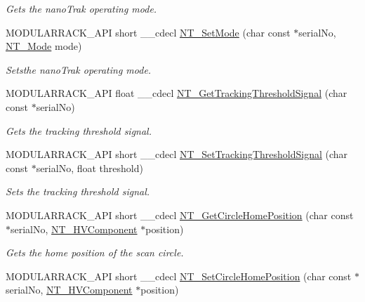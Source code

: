 \begin{DoxyCompactItemize}
\begin{DoxyCompactList}\small\item\em Gets the nano\+Trak operating mode. \end{DoxyCompactList}\item 
M\+O\+D\+U\+L\+A\+R\+R\+A\+C\+K\+\_\+\+A\+PI short \+\_\+\+\_\+cdecl \hyperlink{group___modular_nano_trak_gacd4e02b6f70af52a328723f21e3d4928}{N\+T\+\_\+\+Set\+Mode} (char const $\ast$serial\+No, \hyperlink{group___common_gab868c9a5ae40544a9debc2e28cdef1a8}{N\+T\+\_\+\+Mode} mode)
\begin{DoxyCompactList}\small\item\em Setsthe nano\+Trak operating mode. \end{DoxyCompactList}\item 
M\+O\+D\+U\+L\+A\+R\+R\+A\+C\+K\+\_\+\+A\+PI float \+\_\+\+\_\+cdecl \hyperlink{group___modular_nano_trak_gaf141efe5bca31c33a51767c7dc962811}{N\+T\+\_\+\+Get\+Tracking\+Threshold\+Signal} (char const $\ast$serial\+No)
\begin{DoxyCompactList}\small\item\em Gets the tracking threshold signal. \end{DoxyCompactList}\item 
M\+O\+D\+U\+L\+A\+R\+R\+A\+C\+K\+\_\+\+A\+PI short \+\_\+\+\_\+cdecl \hyperlink{group___modular_nano_trak_ga3d5c305c0e4adfc84d594152b8591684}{N\+T\+\_\+\+Set\+Tracking\+Threshold\+Signal} (char const $\ast$serial\+No, float threshold)
\begin{DoxyCompactList}\small\item\em Sets the tracking threshold signal. \end{DoxyCompactList}\item 
M\+O\+D\+U\+L\+A\+R\+R\+A\+C\+K\+\_\+\+A\+PI short \+\_\+\+\_\+cdecl \hyperlink{group___modular_nano_trak_ga417ba1b1a0552d329bfb685aa61983c6}{N\+T\+\_\+\+Get\+Circle\+Home\+Position} (char const $\ast$serial\+No, \hyperlink{struct_n_t___h_v_component}{N\+T\+\_\+\+H\+V\+Component} $\ast$position)
\begin{DoxyCompactList}\small\item\em Gets the home position of the scan circle. \end{DoxyCompactList}\item 
M\+O\+D\+U\+L\+A\+R\+R\+A\+C\+K\+\_\+\+A\+PI short \+\_\+\+\_\+cdecl \hyperlink{group___modular_nano_trak_gaa5feb1a802f020886607893f7bc5e309}{N\+T\+\_\+\+Set\+Circle\+Home\+Position} (char const $\ast$serial\+No, \hyperlink{struct_n_t___h_v_component}{N\+T\+\_\+\+H\+V\+Component} $\ast$position)

\end{DoxyCompactItemize}
